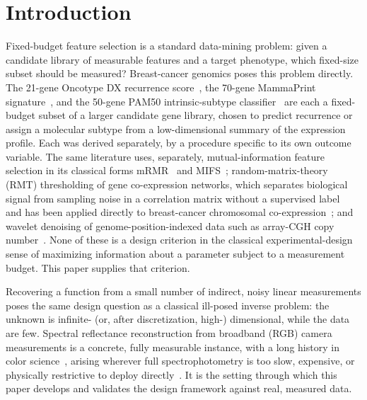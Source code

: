 \documentclass[11pt]{article}
\begin{document}
\begin{abstract}
leave-one-out validation on real, spectrophotometrically measured reflectance (the published BabelColor ColorChecker dataset) gives a factor of five to seven reduction in reconstruction error on measured, not synthetic, data. Code is publicly available.

\medskip
\noindent\textbf{Keywords:} data mining; feature selection; breast cancer; computational genomics; gene-panel design; random matrix theory; Marchenko--Pastur distribution; wavelet denoising; mutual information; differential entropy; ill-posed inverse problems; optimal experimental design; Fisher information; Bayesian regularization; Cram\'{e}r-Rao bound
\end{abstract}

\section{Introduction}

Fixed-budget feature selection is a standard data-mining problem: given a candidate library of measurable features and a target phenotype, which fixed-size subset should be measured? Breast-cancer genomics poses this problem directly. The 21-gene Oncotype DX recurrence score~\citep{ref43}, the 70-gene MammaPrint signature~\citep{ref44}, and the 50-gene PAM50 intrinsic-subtype classifier~\citep{ref45} are each a fixed-budget subset of a larger candidate gene library, chosen to predict recurrence or assign a molecular subtype from a low-dimensional summary of the expression profile. Each was derived separately, by a procedure specific to its own outcome variable. The same literature uses, separately, mutual-information feature selection in its classical forms mRMR~\citep{ref41} and MIFS~\citep{ref42}; random-matrix-theory (RMT) thresholding of gene co-expression networks, which separates biological signal from sampling noise in a correlation matrix without a supervised label~\citep{ref47} and has been applied directly to breast-cancer chromosomal co-expression~\citep{ref46}; and wavelet denoising of genome-position-indexed data such as array-CGH copy number~\citep{ref48}. None of these is a design criterion in the classical experimental-design sense of maximizing information about a parameter subject to a measurement budget. This paper supplies that criterion.

Recovering a function from a small number of indirect, noisy linear measurements poses the same design question as a classical ill-posed inverse problem: the unknown is infinite- (or, after discretization, high-) dimensional, while the data are few. Spectral reflectance reconstruction from broadband (RGB) camera measurements is a concrete, fully measurable instance, with a long history in color science~\citep{ref1}, arising wherever full spectrophotometry is too slow, expensive, or physically restrictive to deploy directly~\citep{ref19,ref20,ref21,ref22,ref23}. It is the setting through which this paper develops and validates the design framework against real, measured data.
\end{document}
